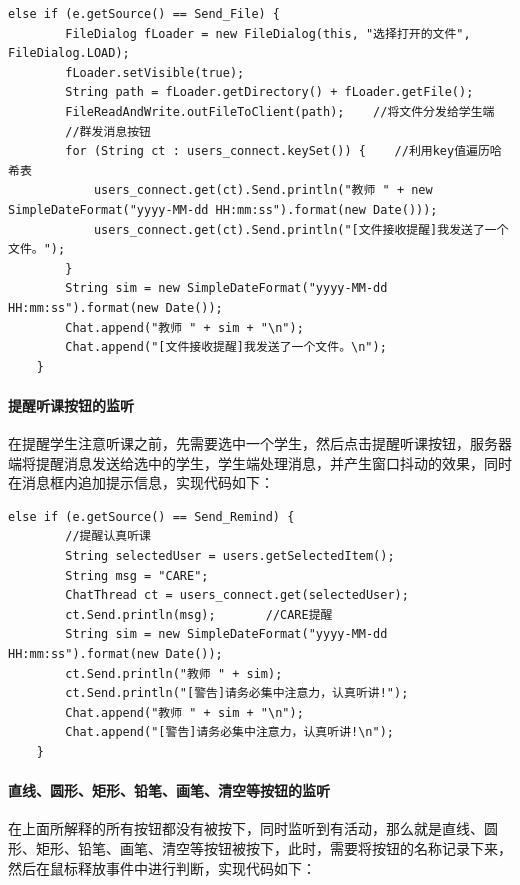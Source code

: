 \documentclass[UTF8,12pt]{article}
\begin{document}
\begin{lstlisting}[title=发送文件按钮的监听,frame=shadowbox]
    else if (e.getSource() == Send_File) {
        FileDialog fLoader = new FileDialog(this, "选择打开的文件", FileDialog.LOAD);
        fLoader.setVisible(true);
        String path = fLoader.getDirectory() + fLoader.getFile();
        FileReadAndWrite.outFileToClient(path);    //将文件分发给学生端
        //群发消息按钮
        for (String ct : users_connect.keySet()) {    //利用key值遍历哈希表
            users_connect.get(ct).Send.println("教师 " + new SimpleDateFormat("yyyy-MM-dd HH:mm:ss").format(new Date()));
            users_connect.get(ct).Send.println("[文件接收提醒]我发送了一个文件。");
        }
        String sim = new SimpleDateFormat("yyyy-MM-dd HH:mm:ss").format(new Date());
        Chat.append("教师 " + sim + "\n");
        Chat.append("[文件接收提醒]我发送了一个文件。\n");
    }
\end{lstlisting}

\paragraph{提醒听课按钮的监听}
在提醒学生注意听课之前，先需要选中一个学生，然后点击提醒听课按钮，服务器端将提醒消息发送给选中的学生，学生端处理消息，并产生窗口抖动的效果，同时在消息框内追加提示信息，实现代码如下：

\begin{lstlisting}[title=提醒听课按钮的监听,frame=shadowbox]
    else if (e.getSource() == Send_Remind) {
        //提醒认真听课
        String selectedUser = users.getSelectedItem();
        String msg = "CARE";
        ChatThread ct = users_connect.get(selectedUser);
        ct.Send.println(msg);       //CARE提醒
        String sim = new SimpleDateFormat("yyyy-MM-dd HH:mm:ss").format(new Date());
        ct.Send.println("教师 " + sim);
        ct.Send.println("[警告]请务必集中注意力，认真听讲!");
        Chat.append("教师 " + sim + "\n");
        Chat.append("[警告]请务必集中注意力，认真听讲!\n");
    }
\end{lstlisting}

\paragraph{直线、圆形、矩形、铅笔、画笔、清空等按钮的监听}
在上面所解释的所有按钮都没有被按下，同时监听到有活动，那么就是直线、圆形、矩形、铅笔、画笔、清空等按钮被按下，此时，需要将按钮的名称记录下来，然后在鼠标释放事件中进行判断，实现代码如下：
\end{document}
